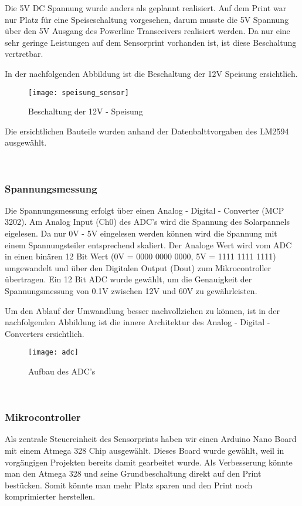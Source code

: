 Die 5V DC Spannung wurde anders als geplannt realisiert. Auf dem Print war nur Platz für eine Speiseschaltung vorgesehen, darum musste die 5V Spannung über den 5V Ausgang des Powerline Transceivers realisiert werden. Da nur eine sehr geringe Leistungen auf dem Sensorprint vorhanden ist, ist diese Beschaltung vertretbar.

In der nachfolgenden Abbildung ist die Beschaltung der 12V Speisung ersichtlich.


\begin{figure}[h]
\centering
\texttt{[image: speisung\_sensor]}
\caption{Beschaltung der 12V - Speisung}
\end{figure}

Die ersichtlichen Bauteile wurden anhand der Datenbalttvorgaben des LM2594 ausgewählt.

\
\
\subsubsection{Spannungsmessung}
Die Spannungsmessung erfolgt über einen Analog - Digital - Converter (MCP 3202). Am Analog Input (Ch0) des ADC's wird die Spannung des Solarpannels eigelesen. Da nur 0V - 5V eingelesen werden können wird die Spannung mit einem Spannungsteiler entsprechend skaliert. Der Analoge Wert wird vom ADC in einen binären 12 Bit Wert (0V = 0000 0000 0000, 5V = 1111 1111 1111) umgewandelt und über den Digitalen Output (Dout) zum Mikrocontroller übertragen. Ein 12 Bit ADC wurde gewählt, um die Genauigkeit der Spannungsmessung von 0.1V zwischen 12V und 60V zu gewährleisten.

Um den Ablauf der Umwandlung besser nachvollziehen zu können, ist in der nachfolgenden Abbildung ist die innere Architektur des Analog - Digital - Converters ersichtlich.

\clearpage
\begin{figure}[h]
\centering
\texttt{[image: adc]}
\caption{Aufbau des ADC's}
\end{figure}

\
\

\subsubsection{Mikrocontroller}
Als zentrale Steuereinheit des Sensorprints haben wir einen Arduino Nano Board mit einem Atmega 328 Chip ausgewählt. Dieses Board wurde gewählt, weil in vorgängigen Projekten bereits damit gearbeitet wurde. Als Verbesserung könnte man den Atmega 328 und seine Grundbeschaltung direkt auf den Print bestücken. Somit könnte man mehr Platz sparen und den Print noch komprimierter herstellen.

